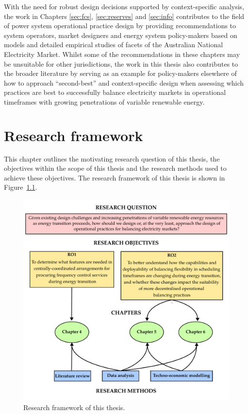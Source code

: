 \documentclass[12pt,a4paper,]{report}
\begin{document}
With the need for robust design decisions supported by context-specific
analysis, the work in Chapters \ref{sec:fcs}, \ref{sec:reserves} and
\ref{sec:info} contributes to the field of power system operational
practice design by providing recommendations to system operators, market
designers and energy system policy-makers based on models and detailed
empirical studies of facets of the Australian National Electricity
Market. Whilst some of the recommendations in these chapters may be
unsuitable for other jurisdictions, the work in this thesis also
contributes to the broader literature by serving as an example for
policy-makers elsewhere of how to approach ``second-best'' and
context-specific design when assessing which practices are best to
successfully balance electricity markets in operational timeframes with
growing penetrations of variable renewable energy.

\hypertarget{sec:research_framework}{%
\chapter{Research framework}\label{sec:research_framework}}

This chapter outlines the motivating research question of this thesis,
the objectives within the scope of this thesis and the research methods
used to achieve these objectives. The research framework of this thesis
is shown in Figure~\ref{fig:research_framework}.

\begin{figure}
\hypertarget{fig:research_framework}{%
\centering
\includegraphics{source/figures/research_framework.pdf}
\caption{Research framework of this
thesis.}\label{fig:research_framework}
}
\end{figure}
\end{document}
